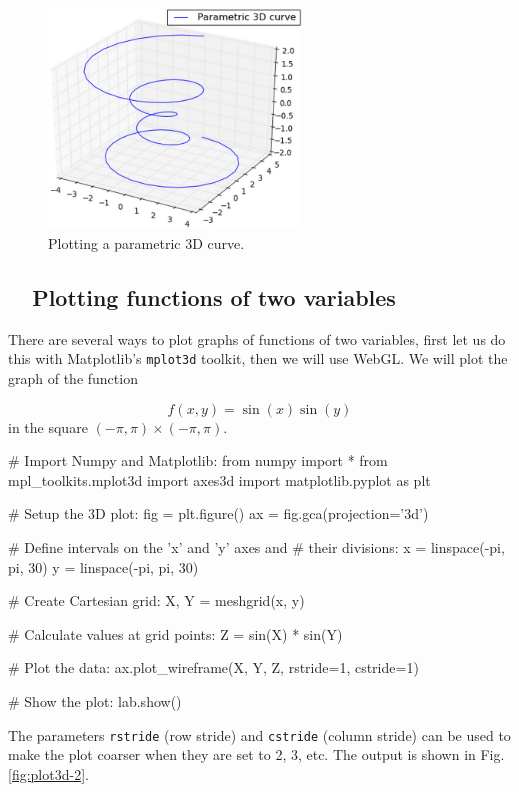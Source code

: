 \begin{figure}[!ht]
\begin{center}
\includegraphics[width=0.6\textwidth]{imgp/plot3d-1.png}
\end{center}
\vspace{-4mm}
\caption{Plotting a parametric 3D curve.}
\label{fig:plot3d-1}
\end{figure}


\subsection{\ \ Plotting functions of two variables}

There are several ways to plot graphs of functions of two variables, 
first let us do this with Matplotlib's {\tt mplot3d} toolkit, then we will
use WebGL. We will plot the graph of the function 

$$
  f(x, y) = \sin(x) \sin(y)
$$
in the square $(-\pi, \pi) \times (-\pi, \pi)$.

\begin{bluecode}
# Import Numpy and Matplotlib:
from numpy import *
from mpl_toolkits.mplot3d import axes3d
import matplotlib.pyplot as plt

# Setup the 3D plot:
fig = plt.figure()
ax = fig.gca(projection='3d')

# Define intervals on the 'x' and 'y' axes and 
# their divisions:
x = linspace(-pi, pi, 30)
y = linspace(-pi, pi, 30)

# Create Cartesian grid:
X, Y = meshgrid(x, y)

# Calculate values at grid points:
Z = sin(X) * sin(Y)

# Plot the data:
ax.plot_wireframe(X, Y, Z, rstride=1, cstride=1)

# Show the plot:
lab.show()
\end{bluecode}
The parameters {\tt rstride} (row stride) and {\tt cstride} (column stride)
can be used to make the plot coarser when they are set to 2, 3, etc.
The output is shown in Fig. \ref{fig:plot3d-2}.
\newpage

